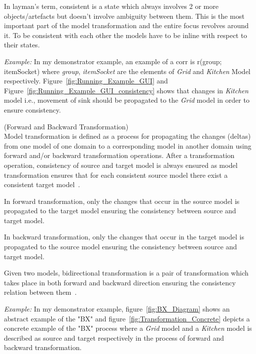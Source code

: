 In layman's term, consistent is a state which always involves 2 or more objects/artefacts but doesn't involve ambiguity between them. This is the most important part of the model transformation and the entire focus revolves around it. To be consistent with each other the models have to be inline with respect to their states. 

\textit{Example:} In my demonstrator example, an example of a corr is r(group; itemSocket) where \textit{group}, \textit{itemSocket} are the elements of \textit{Grid} and \textit{Kitchen} Model respectively. Figure~\ref{fig:Running_Example_GUI} and Figure~\ref{fig:Running_Example_GUI_consistency} shows that changes in \textit{Kitchen} model i.e., movement of sink should be propagated to the \textit{Grid} model in order to ensure consistency.\\

\begin{defn}\label{deffwdbkdtrans} (Forward and Backward Transformation)\\
Model transformation is defined as a process for propagating the changes (deltas) from one model of one domain to a corresponding model in another domain using forward and/or backward transformation operations. After a transformation operation, consistency of source and target model is always ensured as model transformation ensures that for each consistent source model there exist a consistent target model~\cite{modelsynchro-tgg}.

In forward transformation, only the changes that occur in the source model is propagated to the target model ensuring the consistency between source and target model.

In backward transformation, only the changes that occur in the target model is propagated to the source model ensuring the consistency between source and target model.

Given two models, bidirectional transformation is a pair of transformation which takes place in both forward and backward direction ensuring the consistency relation between them~\cite{understanding-bx}.

\end{defn}

\textit{Example:} In my demonstrator example, figure~\ref{fig:BX_Diagram} shows an abstract example of the "BX" and figure~\ref{fig:Transformation_Concrete} depicts a concrete example of the "BX" process where a \textit{Grid} model and a \textit{Kitchen} model is described as source and target respectively in the process of forward and backward transformation.

